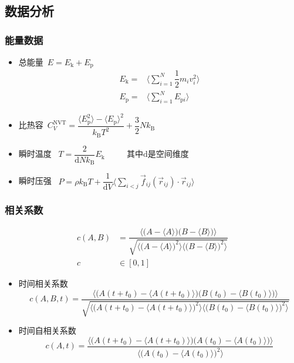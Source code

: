 \subsection{数据分析}
\frame
{
	\frametitle{能量数据}
	\begin{itemize}
		\item 总能量~$E=E_{\mathrm{k}}+E_{\mathrm{p}}$
\begin{displaymath}
	\begin{aligned}
		E_{\mathrm{k}}=&\bigg\langle\sum\limits_{i=1}^N\dfrac12m_iv_i^2\bigg\rangle\\
		E_{\mathrm{p}}=&\bigg\langle\sum\limits_{i=1}^NE_{\mathrm{p}i}\bigg\rangle 
	\end{aligned}
\end{displaymath}
\item 比热容~$C_V^{\mathrm{NVT}}=\dfrac{\big\langle E_{\mathrm{p}}^2\big\rangle-\big\langle E_{\mathrm{p}}\big\rangle^2}{k_{\mathrm{B}}T^2}+\dfrac32Nk_{\mathrm{B}}$
\item 瞬时温度 ~$T=\dfrac2{\mathrm{d}Nk_{\mathrm{B}}}E_{\mathrm{k}}$ ~~~~ 其中$\mathrm{d}$是空间维度
\item 瞬时压强 ~$P=\rho k_{\mathrm{B}}T+\dfrac1{\mathrm{d}V}\bigg\langle\sum\limits_{i<j}\vec f_{ij}(\vec r_{ij})\cdot\vec r_{ij}\bigg\rangle$
	\end{itemize}
}

\frame
{
	\frametitle{相关系数}
	\begin{displaymath}
		\begin{aligned}
			c(A,B)&=\dfrac{\bigg\langle\big(A-\langle A\rangle\big)\big(B-\langle B\rangle\big)\bigg\rangle}{\sqrt{\bigg\langle\big(A-\langle A\rangle\big)^2\bigg\rangle\bigg\langle\big(B-\langle B\rangle\big)^2\bigg\rangle}}\\
			c&\in[0,1]
		\end{aligned}
	\end{displaymath}
	\begin{itemize}
		\item 时间相关系数\\
			\begin{displaymath}
				c(A,B,t)=\dfrac{\bigg\langle\big(A(t+t_0)-\langle A(t+t_0)\rangle\big)\big(B(t_0)-\langle B(t_0)\rangle\big)\bigg\rangle}{\sqrt{\bigg\langle\big(A(t+t_0)-\langle A(t+t_0)\rangle\big)^2\bigg\rangle\bigg\langle\big(B(t_0)-\langle B(t_0)\rangle\big)^2\bigg\rangle}}
			\end{displaymath}
		\item 时间自相关系数
			\begin{displaymath}
				c(A,t)=\dfrac{\bigg\langle\big(A(t+t_0)-\langle A(t+t_0)\rangle\big)\big(A(t_0)-\langle A(t_0)\rangle\big)\bigg\rangle}{\bigg\langle\big(A(t_0)-\langle A(t_0)\rangle\big)^2\bigg\rangle}
			\end{displaymath}
	\end{itemize}
}

